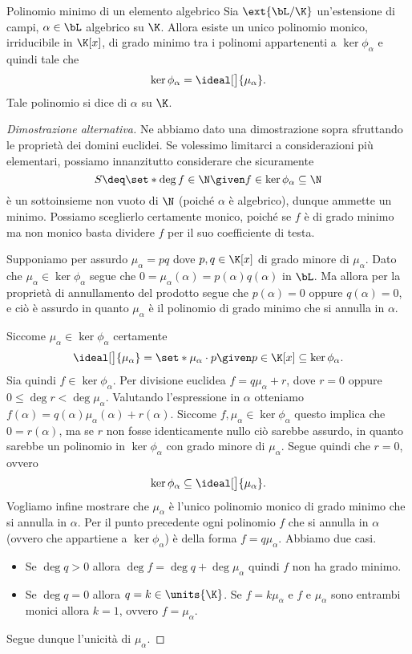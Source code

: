 \begin{proposition}
    {Polinomio minimo di un elemento algebrico}{}
    Sia $\ext{\bL / \K}$ un'estensione di campi, $\alpha \in \bL$ algebrico su $\K$. Allora esiste un unico polinomio monico, irriducibile in $\K[x]$, di grado minimo tra i polinomi appartenenti a $\ker \phi_\alpha$ e quindi tale che \[
        \ker \phi_\alpha = \ideal[\big]{\mu_\alpha}.
    \] Tale polinomio si dice  di $\alpha$ su $\K$.
\end{proposition}
\begin{proof}[Dimostrazione alternativa]
    Ne abbiamo dato una dimostrazione sopra sfruttando le proprietà dei domini euclidei. Se volessimo limitarci a considerazioni più elementari, possiamo innanzitutto considerare che sicuramente \[
        S \deq \set*{\deg f \in \N \given f \in \ker \phi_\alpha} \subseteq \N
    \] è un sottoinsieme non vuoto di $\N$ (poiché $\alpha$ è algebrico), dunque ammette un minimo. 
    Possiamo sceglierlo certamente monico, poiché se $f$ è di grado minimo ma non monico basta dividere $f$ per il suo coefficiente di testa.

     Supponiamo per assurdo $\mu_\alpha = pq$ dove $p, q \in \K[x]$ di grado minore di $\mu_\alpha$. Dato che $\mu_\alpha \in \ker \phi_\alpha$ segue che $0 = \mu_\alpha(\alpha) = p(\alpha)q(\alpha)$ in $\bL$. Ma allora per la proprietà di annullamento del prodotto segue che $p(\alpha) = 0$ oppure $q(\alpha) = 0$, e ciò è assurdo in quanto $\mu_\alpha$ è il polinomio di grado minimo che si annulla in $\alpha$.
    
     Siccome $\mu_\alpha \in \ker \phi_\alpha$ certamente \[
        \ideal[\big]{\mu_\alpha} = \set*{\mu_\alpha \cdot p \given p \in \K[x]} \subseteq \ker \phi_\alpha.
    \] Sia quindi $f \in \ker \phi_\alpha$. Per divisione euclidea $f = q\mu_\alpha + r$, dove $r = 0$ oppure $0 \leq \deg r < \deg \mu_\alpha$. Valutando l'espressione in $\alpha$ otteniamo $f(\alpha) = q(\alpha)\mu_\alpha(\alpha) + r(\alpha)$. Siccome $f, \mu_\alpha \in \ker \phi_\alpha$ questo implica che $0 = r(\alpha)$, ma se $r$ non fosse identicamente nullo ciò sarebbe assurdo, in quanto sarebbe un polinomio in $\ker \phi_\alpha$ con grado minore di $\mu_\alpha$. Segue quindi che $r = 0$, ovvero \[
        \ker \phi_\alpha \subseteq \ideal[\big]{\mu_\alpha}.
    \] 
     Vogliamo infine mostrare che $\mu_\alpha$ è l'unico polinomio monico di grado minimo che si annulla in $\alpha$. Per il punto precedente ogni polinomio $f$ che si annulla in $\alpha$ (ovvero che appartiene a $\ker \phi_\alpha$) è della forma $f = q\mu_\alpha$. Abbiamo due casi. \begin{itemize}
        \item Se $\deg q > 0$ allora $\deg f = \deg q + \deg \mu_\alpha$ quindi $f$ non ha grado minimo.
        \item Se $\deg q = 0$ allora $q = k \in \units{\K}$. Se $f = k\mu_\alpha$ e $f$ e $\mu_\alpha$ sono entrambi monici allora $k = 1$, ovvero $f = \mu_\alpha$.
    \end{itemize} Segue dunque l'unicità di $\mu_\alpha$. 
\end{proof}

